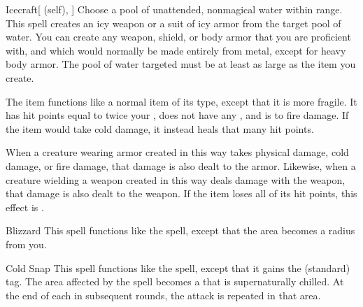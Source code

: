 \lowercase{\hypertarget{spell:Icecraft}{}}\label{spell:Icecraft}
\begin{ability}[\nth{1}]{\hypertarget{spell:Icecraft}{Icecraft}}[ (self), ]
Choose a pool of unattended, nonmagical water within \rngclose range.
This spell creates an icy weapon or a suit of icy armor from the target pool of water.
You can create any weapon, shield, or body armor that you are proficient with, and which would normally be made entirely from metal, except for heavy body armor.
The pool of water targeted must be at least as large as the item you create.

The item functions like a normal item of its type, except that it is more fragile.
It has hit points equal to twice your , does not have any , and is  to fire damage.
If the item would take cold damage, it instead heals that many hit points.

When a creature wearing armor created in this way takes physical damage, cold damage, or fire damage, that damage is also dealt to the armor.
Likewise, when a creature wielding a weapon created in this way deals damage with the weapon, that damage is also dealt to the weapon.
If the item loses all of its hit points, this effect is .
\end{ability}
\vspace{0.25em}



\lowercase{\hypertarget{spell:Blizzard}{}}\label{spell:Blizzard}
\begin{ability}[\nth{2}]{\hypertarget{spell:Blizzard}{Blizzard}}
This spell functions like the  spell, except that the area becomes a \areamed radius from you.
\end{ability}
\vspace{0.25em}



\lowercase{\hypertarget{spell:Cold Snap}{}}\label{spell:Cold Snap}
\begin{ability}[\nth{2}]{\hypertarget{spell:Cold Snap}{Cold Snap}}
This spell functions like the  spell, except that it gains the  (standard) tag.
The area affected by the spell becomes a  that is supernaturally chilled.
At the end of each  in subsequent rounds, the attack is repeated in that area.
\end{ability}
\vspace{0.25em}



